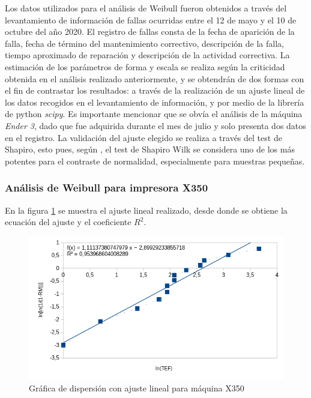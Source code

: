 Los datos utilizados para el análisis de Weibull fueron obtenidos a través del levantamiento de información de fallas ocurridas entre el 12 de mayo y el 10 de octubre del año 2020. El registro de fallas consta de la fecha de aparición de la falla, fecha de término del mantenimiento correctivo, descripción de la falla, tiempo aproximado de reparación y descripción de la actividad correctiva.
La estimación de los parámetros de forma y escala se realiza según la criticidad obtenida en el análisis realizado anteriormente, y se obtendrán de dos formas con el fin de contrastar los resultados: a través de la realización de un ajuste lineal de los datos recogidos en el levantamiento de información, y por medio de la librería de python \textit{scipy}. Es importante mencionar que se obvía el análisis de la máquina \textit{Ender 3}, dado que fue adquirida durante el mes de julio y solo presenta dos datos en el registro. La validación del ajuste elegido se realiza a través del test de Shapiro, esto pues, según \cite{correa2018}, el test de Shapiro Wilk se considera uno de los más potentes para el contraste de normalidad, especialmente para muestras pequeñas. 

\subsubsection{Análisis de Weibull para impresora X350}

En la figura \ref{weibx350} se muestra el ajuste lineal realizado, desde donde se obtiene la ecuación del ajuste y el coeficiente $R^2$. 

\begin{figure}[H]
\centering
\includegraphics[scale=0.9]{images/weibullx350.png}
\caption{Gráfica de dispersión con ajuste lineal para máquina X350}
\label{weibx350}
\end{figure}


